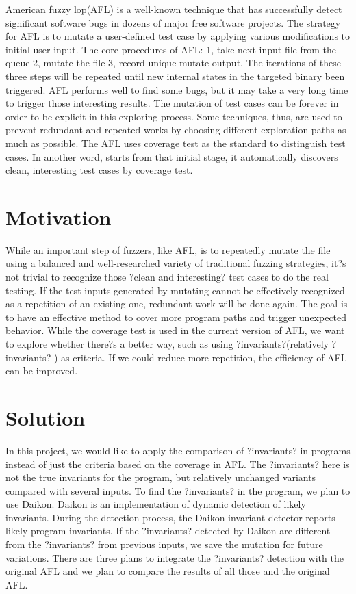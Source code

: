 \documentclass[sigplan,10pt,review]{acmart}\settopmatter{printfolios=true,printccs=false,printacmref=false}
\begin{document}
American fuzzy lop(AFL) is a well-known technique that has successfully detect significant software bugs in dozens of major free software projects. The strategy for AFL is to mutate a user-defined test case by applying various modifications to initial user input. The core procedures of AFL: 1, take next input file from the queue 2, mutate the file 3, record unique mutate output. The iterations of these three steps will be repeated until new internal states in the targeted binary been triggered. AFL performs well to find some bugs, but it may take a very long time to trigger those interesting results. The mutation of test cases can be forever in order to be explicit in this exploring process. Some techniques, thus, are used to prevent redundant and repeated works by choosing different exploration paths as much as possible. The AFL uses coverage test as the standard to distinguish test cases. In another word, starts from that initial stage, it automatically discovers   clean,   interesting   test   cases   by   coverage   test.

\section{Motivation}

While an important step of fuzzers, like AFL, is to repeatedly mutate the file using a balanced and well-researched variety of traditional fuzzing strategies, it?s not trivial to recognize those ?clean and interesting? test cases to do the real testing. If the test inputs generated by mutating cannot be effectively recognized as a repetition of an existing one, redundant work will be done again. The goal is to have an effective method to cover more program paths and trigger unexpected behavior. While the coverage test is used in the current version of AFL, we want to explore whether there?s a better way, such as using ?invariants?(relatively ?invariants? ) as criteria. If we could reduce more repetition, the efficiency of AFL can be improved.

\section{Solution}
In this project, we would like to apply the comparison of ?invariants? in programs instead of just the criteria based on the coverage in AFL. The ?invariants? here is not the true invariants for the program, but relatively unchanged variants compared with several inputs. To find the ?invariants? in the program, we plan to use Daikon. Daikon is an implementation of dynamic detection of likely invariants. During the detection process, the Daikon invariant detector reports likely program invariants. If the ?invariants? detected by Daikon are different from the ?invariants? from previous inputs, we save the mutation for future variations. There are three plans to integrate the ?invariants? detection with the original AFL and we plan to compare the results of all those and the original AFL.
\end{document}

